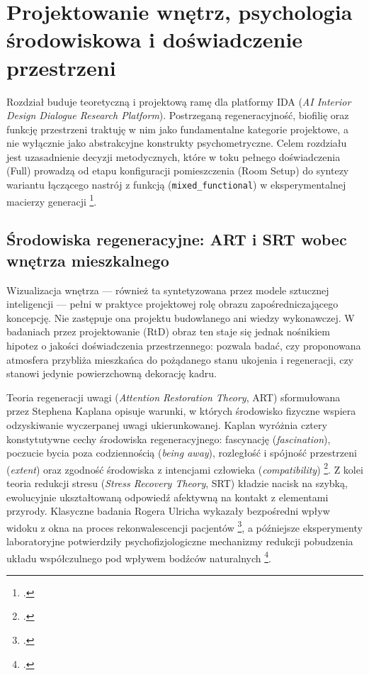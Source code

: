 \chapter{Projektowanie wnętrz, psychologia środowiskowa i doświadczenie przestrzeni}
\label{ch02:top}

Rozdział buduje teoretyczną i projektową ramę dla platformy IDA (\emph{AI Interior Design Dialogue Research Platform}). Postrzeganą regeneracyjność, biofilię oraz funkcję przestrzeni traktuję w nim jako fundamentalne kategorie projektowe, a nie wyłącznie jako abstrakcyjne konstrukty psychometryczne.
Celem rozdziału jest uzasadnienie decyzji metodycznych, które w toku pełnego doświadczenia (Full) prowadzą od etapu konfiguracji pomieszczenia (Room Setup) do syntezy wariantu łączącego nastrój z funkcją (\texttt{mixed\_functional}) w eksperymentalnej macierzy generacji \footcite{idaPlatform2026}.

\section{Środowiska regeneracyjne: ART i SRT wobec wnętrza mieszkalnego}
\label{ch02:sec:art}

Wizualizacja wnętrza --- również ta syntetyzowana przez modele sztucznej inteligencji --- pełni w praktyce projektowej rolę obrazu zapośredniczającego koncepcję. Nie zastępuje ona projektu budowlanego ani wiedzy wykonawczej.
W badaniach przez projektowanie (RtD) obraz ten staje się jednak nośnikiem hipotez o jakości doświadczenia przestrzennego: pozwala badać, czy proponowana atmosfera przybliża mieszkańca do pożądanego stanu ukojenia i regeneracji, czy stanowi jedynie powierzchowną dekorację kadru.

Teoria regeneracji uwagi (\emph{Attention Restoration Theory}, ART) sformułowana przez Stephena Kaplana opisuje warunki, w których środowisko fizyczne wspiera odzyskiwanie wyczerpanej uwagi ukierunkowanej. Kaplan wyróżnia cztery konstytutywne cechy środowiska regeneracyjnego: fascynację (\emph{fascination}), poczucie bycia poza codziennością (\emph{being away}), rozległość i spójność przestrzeni (\emph{extent}) oraz zgodność środowiska z intencjami człowieka (\emph{compatibility}) \footcite{kaplan1995restorative}.
Z kolei teoria redukcji stresu (\emph{Stress Recovery Theory}, SRT) kładzie nacisk na szybką, ewolucyjnie ukształtowaną odpowiedź afektywną na kontakt z elementami przyrody. Klasyczne badania Rogera Ulricha wykazały bezpośredni wpływ widoku z okna na proces rekonwalescencji pacjentów \footcite{ulrich1984window}, a późniejsze eksperymenty laboratoryjne potwierdziły psychofizjologiczne mechanizmy redukcji pobudzenia układu współczulnego pod wpływem bodźców naturalnych \footcite{ulrich1991stress}.


